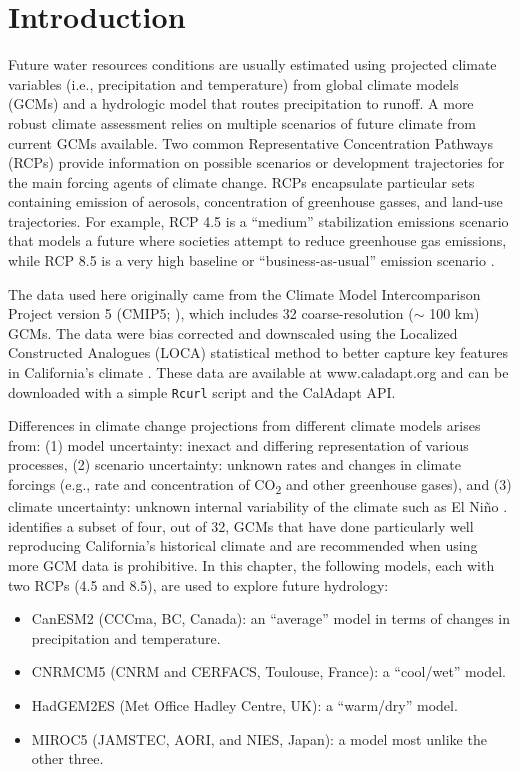 \section{Introduction}
Future water resources conditions are usually estimated using projected climate variables (i.e., precipitation and temperature) from global climate models (GCMs) and a hydrologic model that routes precipitation to runoff. A more robust climate assessment relies on multiple scenarios of future climate from current GCMs available. Two common Representative Concentration Pathways (RCPs) provide information on possible scenarios or development trajectories for the main forcing agents of climate change. RCPs encapsulate particular sets containing emission of aerosols, concentration of greenhouse gasses, and land-use trajectories. For example, RCP 4.5 is a ``medium'' stabilization emissions scenario that models a future where societies attempt to reduce greenhouse gas emissions, while RCP 8.5 is a very high baseline or ``business-as-usual'' emission scenario \cite{van2011representative}. 

The data used here originally came from the Climate Model Intercomparison Project version 5 (CMIP5; ), which includes 32 coarse-resolution ($\sim$ 100 km) GCMs. The data were bias corrected and downscaled using the Localized Constructed Analogues (LOCA) statistical method to better capture key features in California's climate \cite{pierce2018climate}. These data are available at www.caladapt.org and can be downloaded with a simple {\tt Rcurl} script and the CalAdapt API. 

Differences in climate change projections from different climate models arises from: (1) model uncertainty: inexact and differing representation of various processes, (2) scenario uncertainty: unknown rates and changes in climate forcings (e.g., rate and concentration of CO\textsubscript{2} and other greenhouse gases), and (3) climate uncertainty: unknown  internal variability of the climate such as El Niño \cite{hawkins2011potential}.  identifies a subset of four, out of 32, GCMs that have done particularly well reproducing California's historical climate and are recommended when using more GCM data is prohibitive. In this chapter, the following models, each with two RCPs (4.5 and 8.5), are used to explore future hydrology:

\begin{itemize}
	\item CanESM2 (CCCma, BC, Canada): an ``average'' model in terms of changes in precipitation and temperature.
	\item CNRM\-CM5 (CNRM and CERFACS, Toulouse, France): a ``cool/wet'' model. %
	\item HadGEM2\-ES (Met Office Hadley Centre, UK): a ``warm/dry'' model.
	\item MIROC5 (JAMSTEC, AORI, and NIES, Japan): a model most unlike the other three.
\end{itemize}

